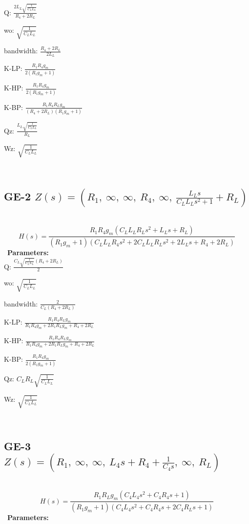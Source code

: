 \documentclass{article}
\begin{document}
Q: $\frac{2 L_{L} \sqrt{\frac{1}{C_{L} L_{L}}}}{R_{4} + 2 R_{L}}$\ 

wo: $\sqrt{\frac{1}{C_{L} L_{L}}}$\ 

bandwidth: $\frac{R_{4} + 2 R_{L}}{2 L_{L}}$\ 

K-LP: $\frac{R_{1} R_{4} g_{m}}{2 \left(R_{1} g_{m} + 1\right)}$\ 

K-HP: $\frac{R_{1} R_{4} g_{m}}{2 \left(R_{1} g_{m} + 1\right)}$\ 

K-BP: $\frac{R_{1} R_{4} R_{L} g_{m}}{\left(R_{4} + 2 R_{L}\right) \left(R_{1} g_{m} + 1\right)}$\ 

Qz: $\frac{L_{L} \sqrt{\frac{1}{C_{L} L_{L}}}}{R_{L}}$\ 

Wz: $\sqrt{\frac{1}{C_{L} L_{L}}}$\ 

\ 

\subsection{GE-2 $Z(s) = \left( R_{1}, \  \infty, \  \infty, \  R_{4}, \  \infty, \  \frac{L_{L} s}{C_{L} L_{L} s^{2} + 1} + R_{L}\right)$ } \ 
\textbf{\[H(s) = \frac{R_{1} R_{4} g_{m} \left(C_{L} L_{L} R_{L} s^{2} + L_{L} s + R_{L}\right)}{\left(R_{1} g_{m} + 1\right) \left(C_{L} L_{L} R_{4} s^{2} + 2 C_{L} L_{L} R_{L} s^{2} + 2 L_{L} s + R_{4} + 2 R_{L}\right)}\] } \ 
\textbf{Parameters:}\\ 

Q: $\frac{C_{L} \sqrt{\frac{1}{C_{L} L_{L}}} \left(R_{4} + 2 R_{L}\right)}{2}$\ 

wo: $\sqrt{\frac{1}{C_{L} L_{L}}}$\ 

bandwidth: $\frac{2}{C_{L} \left(R_{4} + 2 R_{L}\right)}$\ 

K-LP: $\frac{R_{1} R_{4} R_{L} g_{m}}{R_{1} R_{4} g_{m} + 2 R_{1} R_{L} g_{m} + R_{4} + 2 R_{L}}$\ 

K-HP: $\frac{R_{1} R_{4} R_{L} g_{m}}{R_{1} R_{4} g_{m} + 2 R_{1} R_{L} g_{m} + R_{4} + 2 R_{L}}$\ 

K-BP: $\frac{R_{1} R_{4} g_{m}}{2 \left(R_{1} g_{m} + 1\right)}$\ 

Qz: $C_{L} R_{L} \sqrt{\frac{1}{C_{L} L_{L}}}$\ 

Wz: $\sqrt{\frac{1}{C_{L} L_{L}}}$\ 

\ 

\subsection{GE-3 $Z(s) = \left( R_{1}, \  \infty, \  \infty, \  L_{4} s + R_{4} + \frac{1}{C_{4} s}, \  \infty, \  R_{L}\right)$ } \ 
\textbf{\[H(s) = \frac{R_{1} R_{L} g_{m} \left(C_{4} L_{4} s^{2} + C_{4} R_{4} s + 1\right)}{\left(R_{1} g_{m} + 1\right) \left(C_{4} L_{4} s^{2} + C_{4} R_{4} s + 2 C_{4} R_{L} s + 1\right)}\] } \ 
\textbf{Parameters:}\\ 
\end{document}
